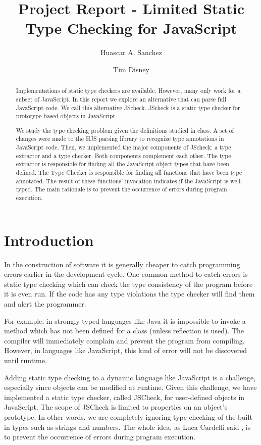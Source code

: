 \documentclass{article}
\begin{document}
\title{Project Report - Limited Static Type Checking for JavaScript}
\author{Huascar A. Sanchez \and Tim Disney}

\maketitle

\lstset{showstringspaces=false}

\begin{abstract}
Implementations of static type checkers are available. However, many only work
for a subset of JavaScript. In this report we explore an alternative that can 
parse full JavaScript code. We call this alternative JScheck. JScheck is a static 
type checker for prototype-based objects in JavaScript.

We study the type checking problem given the definitions studied in class. A set of
changes were made to the HJS parsing library to recognize type annotations in 
JavaScript code. Then, we implemented the major components of JScheck: a type extractor
and a type checker. Both components complement each other. The type extractor is 
responsible for finding all the JavaScript object types that have been defined. The 
Type Checker is responsible for finding all functions that have been type annotated. 
The result of these functions' invocation indicates if the JavaScript is well-typed. 
The main rationale is to prevent the occurrence of errors during program execution. 
\end{abstract}

\section{Introduction}
In the construction of software it is generally cheaper to 
catch programming errors earlier in the development cycle. One common method 
to catch errors is static type checking which can
check the type consistency of the program before it is even
run. If the code has any type violations the type checker will 
find them and alert the programmer.

For example, in strongly typed languages like Java it is impossible 
to invoke a method which has not been defined for a class (unless reflection is used).
The compiler will immediately complain and prevent the program from compiling. However, 
in languages like JavaScript, this kind of error will not be discovered until runtime.

Adding static type checking to a dynamic language like JavaScript is a 
challenge, especially since objects can be modified at runtime. Given this challenge, 
we have implemented a static type checker, called JSCheck, for user-defined objects 
in JavaScript. The scope of JSCheck is limited to properties on an object's
prototype. In other words, we are completely ignoring type checking of the built in types
such as strings and numbers. The whole idea, as Luca Cardelli said \cite{typesystems}, 
is to prevent the occurrence of errors during program execution. 
\end{document}
